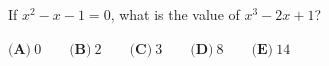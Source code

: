 If $x^2-x-1=0$, what is the value of $x^3-2x+1$?

$\textbf{(A)}\ 0\qquad\textbf{(B)}\ 2\qquad\textbf{(C)}\ 3\qquad\textbf{(D)}\ 8\qquad\textbf{(E)}\ 14$
